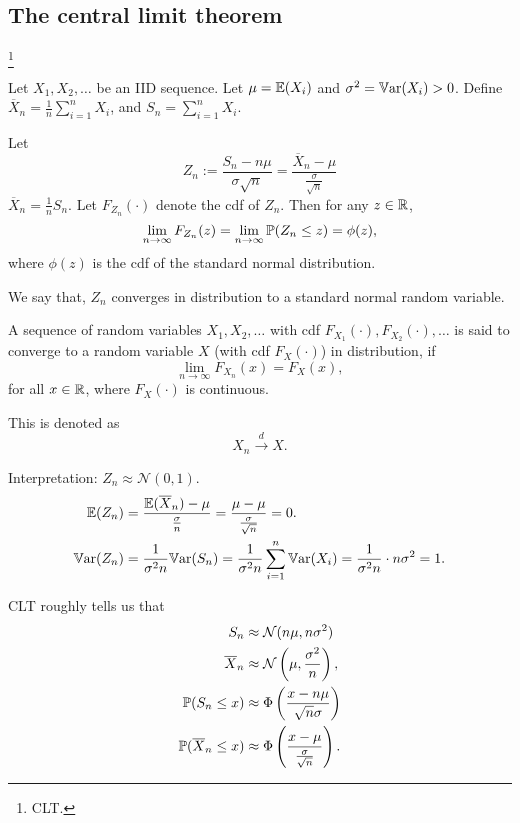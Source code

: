 \documentclass[10pt, a4paper]{article}
\begin{document}
\subsection{The central limit theorem}\footnote{CLT.}

\begin{theorem}
    Let $X_1, X_2, \dotsc$ be an IID sequence.
    Let $\mu = \E(X_i)$ and $\sigma ^ 2 = \Var(X_i) > 0$.
    Define $\overline{X}_n = \frac{1}{n}\sum_{i = 1}^{n}X_i$,
    and  $S_n = \sum_{i = 1}^{n}X_i$.

    Let
    \[
    Z_n := \frac{S_n - n\mu}{\sigma\sqrt{n}} = \frac{\overline{X}_n - \mu}{\frac{\sigma}{\sqrt{n}}}
    \]
    $\overline{X}_n = \frac{1}{n}S_n$.
    Let $F_{Z_n}(\cdot)$ denote the cdf of $Z_n$.
    Then for any $z \in \R$,
    \[
    \lim_{n \rightarrow \infty}F_{Z_n}(z) = \lim_{n \rightarrow \infty}\P(Z_n \leq z) = \phi(z),
    \]
    where $\phi(z)$ is the cdf of the standard normal distribution.
\end{theorem}

We say that,
$Z_n$ converges in distribution to a standard normal random variable.

\begin{definition}
    A sequence of random variables $X_1, X_2, \dotsc$ with cdf $F_{X_1}(\cdot), F_{X_2}(\cdot), \dotsc$ is said to converge to a random variable $X$
    (with cdf $F_X(\cdot)$)
    in distribution,
    if
    \[
    \lim_{n \rightarrow \infty}F_{X_n}(x) = F_{X}(x),
    \]
    for all $x \in \R$,
    where $F_X(\cdot)$ is continuous.
    
    This is denoted as
    \[
    X_n \xrightarrow{d} X.
    \]
\end{definition}

Interpretation:
$Z_n \approx \mathcal{N}(0, 1)$.
\begin{align*}
    \E(Z_n) &= \frac{\E(\overline{X}_n) - \mu}{\frac{\sigma}{n}} = \frac{\mu - \mu}{\frac{\sigma}{\sqrt{n}}} = 0. \\
    \Var(Z_n) &= \frac{1}{\sigma ^ 2 n}\Var(S_n) = \frac{1}{\sigma ^ 2n}\sum_{i = 1}^{n}\Var(X_i) = \frac{1}{\sigma ^ 2 n}\cdot n\sigma ^ 2 = 1.
\end{align*}

CLT roughly tells us that
\begin{align*}
    S_n &\approx \mathcal{N}(n\mu, n \sigma ^ 2) \\
    \overline{X}_n &\approx \mathcal{N}\left(\mu, \frac{\sigma ^ 2}{n}\right), \\
    \P(S_n \leq x) &\approx \Phi\left(\frac{x - n\mu}{\sqrt{n}\sigma}\right) \\
    \P(\overline{X}_n \leq x) &\approx \Phi\left(\frac{x - \mu}{\frac{\sigma}{\sqrt{n}}}\right).
\end{align*}
\end{document}
